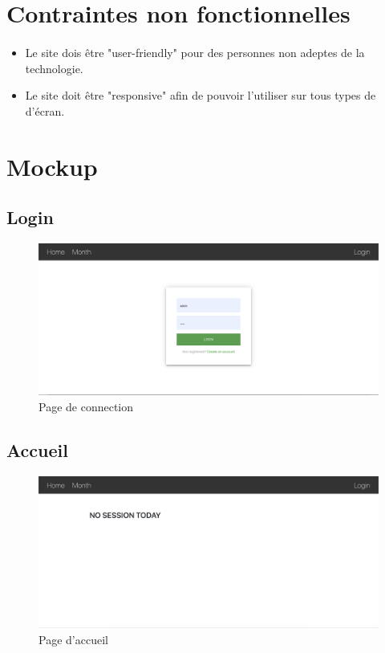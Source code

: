 \vspace{\baselineskip}
\section{Contraintes non fonctionnelles}
	\paragraph{}
		\begin{itemize}
			\item Le site dois être "user-friendly" pour des personnes non adeptes de la technologie. 
			\item Le site doit être "responsive" afin de pouvoir l'utiliser sur tous types de d'écran. 
		\end{itemize}

\newpage
\section{Mockup}
	\subsection{Login}
		\begin{figure}[!htbp]
       	 	\includegraphics[width=0.8\linewidth, center]{Mockup/Login.png}
       	 	\caption{Page de connection}
       	\end{figure}
       	
    \vspace{\baselineskip}
	\subsection{Accueil}
		\begin{figure}[!htbp]
       	 	\includegraphics[width=0.8\linewidth, center]{Mockup/Accueil.png}
       	 	\caption{Page d'accueil}
       	\end{figure}
       	
